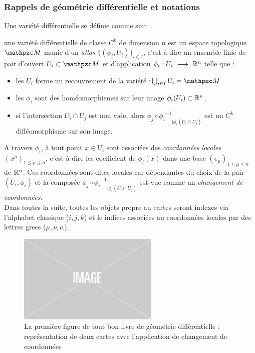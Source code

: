 \subsubsection{Rappels de géométrie différentielle et notations}\label{subsec:rappel2geo_diff}

Une variété différentielle se définie comme suit :
\begin{definition} \label{defvarietoche}
	une variété différentielle de classe $C^k$ de dimension $n$ est un espace topologique
	$\manu$ munie d'un \emph{atlas} $\big\{ (\phi_i, U_i) \big\}_{i\in I}$, c'est-à-dire un ensemble finie de pair d'ouvert $U_i\subset \manu$ et d'application $\phi_i :U_i\ \longrightarrow\ \mathbb{R}^n$ telle que :
	\begin{itemize}
		
		\item les $U_i$ forme un recouvrement de la variété :\qquad $\bigcup_{i\in I} U_i = \manu$
		
		\item les $\phi_i$ sont des homéomorphismes sur leur image $\phi_i(U_i)\subset\mathbb{R}^n$.
		
		\item si l'intersection $U_i \cap U_j$ est non vide, alors ${\phi_j \circ {\phi_i}^{-1}}_{| {\phi_i}(U_i\cap U_j)}$ est un $C^k$ difféomorphisme sur son image.
		
	\end{itemize}
	A travers $\phi_i$, à tout point $x\in U_i$ sont associées des \emph{coordonnées locales} $(x^\mu)_{1\leq \mu\leq n}$, c'est-à-dire les coefficient de $\phi_i(x)$ dans une base $(e_\mu)_{1\leq \mu\leq n}$ de $\mathbb{R}^n$. Ces coordonnées sont dites locales car dépendantes du choix de la pair $(U_i,\phi_i)$ et la composée ${\phi_j \circ {\phi_i}^{-1}}_{| {\phi_i}(U_i\cap U_j)}$ est vue comme un \emph{changement de coordonnées}.\\
	Dans toutes la suite, toutes les objets propre au cartes seront indexes via l'alphabet classique ($i,j,k$) et le indices associées au coordonnées locales par des lettres grecs ($\mu,\nu,\alpha$).
\end{definition}

\begin{figure}[h]
	\includegraphics[width=0.6\textwidth]{fig/placeholder}
	\caption[La première figure de tout bon livre de géométrie différentielle]{La première figure de tout bon livre de géométrie différentielle : représentation de deux cartes avec l'application de changement de coordonnées}
\end{figure}

